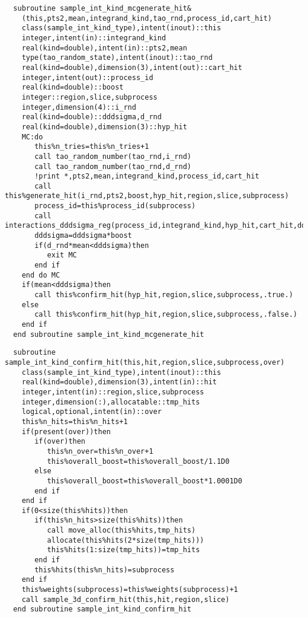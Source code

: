 \begin{Verbatim}
  subroutine sample_int_kind_mcgenerate_hit&
    (this,pts2,mean,integrand_kind,tao_rnd,process_id,cart_hit)
    class(sample_int_kind_type),intent(inout)::this
    integer,intent(in)::integrand_kind
    real(kind=double),intent(in)::pts2,mean
    type(tao_random_state),intent(inout)::tao_rnd
    real(kind=double),dimension(3),intent(out)::cart_hit
    integer,intent(out)::process_id
    real(kind=double)::boost
    integer::region,slice,subprocess
    integer,dimension(4)::i_rnd
    real(kind=double)::dddsigma,d_rnd
    real(kind=double),dimension(3)::hyp_hit
    MC:do 
       this%n_tries=this%n_tries+1
       call tao_random_number(tao_rnd,i_rnd)
       call tao_random_number(tao_rnd,d_rnd)
       !print *,pts2,mean,integrand_kind,process_id,cart_hit
       call this%generate_hit(i_rnd,pts2,boost,hyp_hit,region,slice,subprocess)
       process_id=this%process_id(subprocess)
       call interactions_dddsigma_reg(process_id,integrand_kind,hyp_hit,cart_hit,dddsigma)
       dddsigma=dddsigma*boost
       if(d_rnd*mean<dddsigma)then
          exit MC
       end if
    end do MC
    if(mean<dddsigma)then
       call this%confirm_hit(hyp_hit,region,slice,subprocess,.true.)
    else
       call this%confirm_hit(hyp_hit,region,slice,subprocess,.false.)
    end if
  end subroutine sample_int_kind_mcgenerate_hit
\end{Verbatim}

\begin{Verbatim}
  subroutine sample_int_kind_confirm_hit(this,hit,region,slice,subprocess,over)
    class(sample_int_kind_type),intent(inout)::this
    real(kind=double),dimension(3),intent(in)::hit
    integer,intent(in)::region,slice,subprocess
    integer,dimension(:),allocatable::tmp_hits
    logical,optional,intent(in)::over
    this%n_hits=this%n_hits+1
    if(present(over))then
       if(over)then
          this%n_over=this%n_over+1
          this%overall_boost=this%overall_boost/1.1D0
       else
          this%overall_boost=this%overall_boost*1.0001D0
       end if
    end if
    if(0<size(this%hits))then
       if(this%n_hits>size(this%hits))then
          call move_alloc(this%hits,tmp_hits)
          allocate(this%hits(2*size(tmp_hits)))
          this%hits(1:size(tmp_hits))=tmp_hits
       end if
       this%hits(this%n_hits)=subprocess
    end if
    this%weights(subprocess)=this%weights(subprocess)+1
    call sample_3d_confirm_hit(this,hit,region,slice)
  end subroutine sample_int_kind_confirm_hit
\end{Verbatim}

